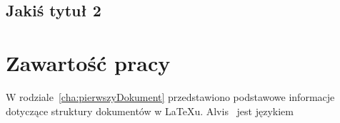 \subsection{Jakiś tytuł 2}


\section{Zawartość pracy}
\label{sec:zawartoscPracy}

W rodziale~\ref{cha:pierwszyDokument} przedstawiono podstawowe informacje dotyczące struktury dokumentów w \LaTeX u. Alvis~\cite{Alvis2011} jest językiem 


















